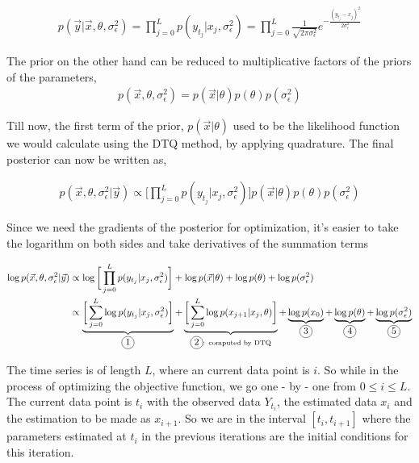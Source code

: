 \documentclass[a4paper,11pt]{article}
\newcommand\encircle[1]{%
\tikz[baseline=(X.base)]
\node (X) [draw, shape=circle, inner sep=0] {\strut #1};}
\begin{document}
\begin{align*}
p(\vec{y} | \vec{x}, \theta, \sigma^2_{\epsilon}) = \prod_{j=0}^L p(y_{t_{j}} | x_j, \sigma^2_{\epsilon}) = \prod_{j=0}^{L} \frac{1} {\sqrt{2 \pi \sigma^2_{\epsilon}}} e^{- \frac{(y_{t_{j}} - x_j)^2}{2 \sigma^2_{\epsilon}}}
\end{align*}

The prior on the other hand can be reduced to multiplicative factors of the priors of the parameters,
\begin{align*}
p(\vec{x}, \theta, \sigma^2_{\epsilon}) = p(\vec{x} | \theta) p(\theta) p(\sigma^2_{\epsilon})
\end{align*}

Till now, the first term of the prior, $p(\vec{x} | \theta)$ used to be the likelihood function we would calculate using the DTQ method, by applying quadrature. The final posterior can now be written as,

\begin{align*}
p(\vec{x}, \theta, \sigma^2_{\epsilon} | \vec{y}) \propto \bigg[\prod_{j=0}^L p(y_{t_{j}} | x_j, \sigma^2_{\epsilon}) \bigg] p(\vec{x} | \theta) p(\theta) p(\sigma^2_{\epsilon})
\end{align*}

Since we need the gradients of the posterior for optimization, it's easier to take the logarithm on both sides and take derivatives of the summation terms

\begin{align*}
\log p(\vec{x}, \theta, \sigma^2_{\epsilon} | \vec{y}) & \propto \log \bigg[\prod_{j=0}^L p(y_{t_{j}} | x_j, \sigma^2_{\epsilon}) \bigg] + \log p(\vec{x} | \theta) + \log p(\theta) + \log p(\sigma^2_{\epsilon}) \\
& \propto \underbrace{\bigg[\sum_{j=0}^L \log p(y_{t_{j}} | x_j, \sigma^2_{\epsilon}) \bigg]}_{\encircle{1}} + \underbrace{\bigg[\sum_{j=0}^L \log p(x_{j+1} | x_j, \theta) \bigg]}_{\encircle{2} \text{: computed by DTQ}} + \underbrace{\log p(x_0)}_{\encircle{3}} + \underbrace{\log p(\theta)}_{\encircle{4}} + \underbrace{\log p(\sigma^2_{\epsilon})}_{\encircle{5}}
\end{align*}

The time series is of length $L$, where an current data point is $i$. So while in the process of optimizing the objective function, we go one - by - one from $0 \leq i \leq L$. The current data point is $t_{i}$ with the observed data $Y_{t_{i}}$, the estimated data $x_{i}$ and the estimation to be made as $x_{i+1}$. So we are in the interval $[t_{i}, t_{i+1}]$ where the parameters estimated at $t_{i}$ in the previous iterations are the initial conditions for this iteration. \\
\end{document}
